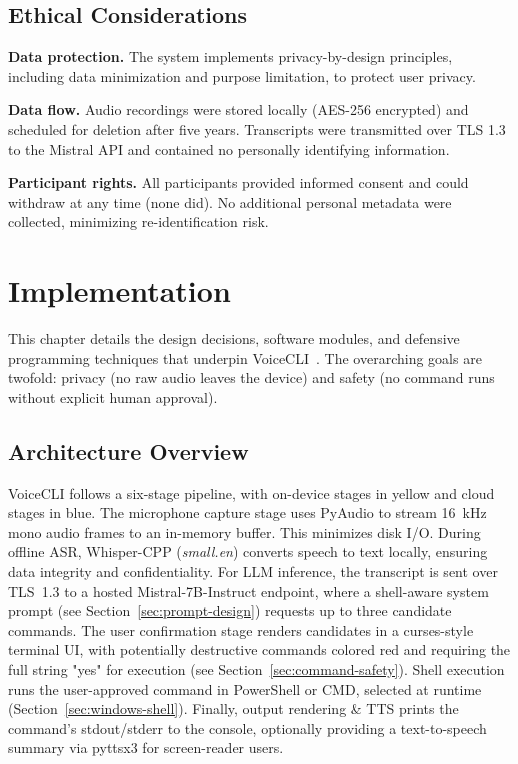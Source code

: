 \documentclass[a4paper,12pt]{article}
\begin{document}
\subsection{Ethical Considerations}
\noindent \textbf{Data protection.} The system implements privacy-by-design principles, including data minimization and purpose limitation, to protect user privacy.

\textbf{Data flow.} Audio recordings were stored locally (AES-256 encrypted) and scheduled for deletion after five years. Transcripts were transmitted over TLS 1.3 to the Mistral API and contained no personally identifying information.

\textbf{Participant rights.} All participants provided informed consent and could withdraw at any time (none did). No additional personal metadata were collected, minimizing re-identification risk.

\newpage
\section{Implementation}
\noindent This chapter details the design decisions, software modules, and defensive programming techniques that underpin VoiceCLI~\cite{ref25}. The overarching goals are twofold: privacy (no raw audio leaves the device) and safety (no command runs without explicit human approval).

\subsection{Architecture Overview}
\noindent VoiceCLI follows a six-stage pipeline, with on-device stages in yellow and cloud stages in blue. The microphone capture stage uses PyAudio to stream 16~kHz mono audio frames to an in-memory buffer. This minimizes disk I/O. During offline ASR, Whisper-CPP (\textit{small.en}) converts speech to text locally, ensuring data integrity and confidentiality. For LLM inference, the transcript is sent over TLS~1.3 to a hosted Mistral-7B-Instruct endpoint, where a shell-aware system prompt (see Section~\ref{sec:prompt-design}) requests up to three candidate commands. The user confirmation stage renders candidates in a curses-style terminal UI, with potentially destructive commands colored red and requiring the full string "yes" for execution (see Section~\ref{sec:command-safety}). Shell execution runs the user-approved command in PowerShell or CMD, selected at runtime (Section~\ref{sec:windows-shell}). Finally, output rendering \& TTS prints the command's stdout/stderr to the console, optionally providing a text-to-speech summary via pyttsx3 for screen-reader users.
\end{document}
